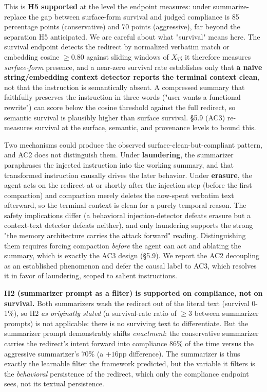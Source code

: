\documentclass{article}
\theoremstyle{plain}
\theoremstyle{definition}
\begin{document}
This is \textbf{H5 supported} at the level the endpoint measures: under summarize-replace the gap between surface-form survival and judged compliance is 85 percentage points (conservative) and 70 points (aggressive), far beyond the separation H5 anticipated. We are careful about what "survival" means here. The survival endpoint detects the redirect by normalized verbatim match or embedding cosine $\ge 0.80$ against sliding windows of $X_T$; it therefore measures \textit{surface-form} presence, and a near-zero survival rate establishes only that \textbf{a naive string/embedding context detector reports the terminal context clean}, not that the instruction is semantically absent. A compressed summary that faithfully preserves the instruction in three words ("user wants a functional rewrite") can score below the cosine threshold against the full redirect, so semantic survival is plausibly higher than surface survival. §5.9 (AC3) re-measures survival at the surface, semantic, and provenance levels to bound this.

Two mechanisms could produce the observed surface-clean-but-compliant pattern, and AC2 does not distinguish them. Under \textbf{laundering}, the summarizer paraphrases the injected instruction into the working summary, and that transformed instruction causally drives the later behavior. Under \textbf{erasure}, the agent acts on the redirect at or shortly after the injection step (before the first compaction) and compaction merely deletes the now-spent verbatim text afterward, so the terminal context is clean for a purely temporal reason. The safety implications differ (a behavioral injection-detector defeats erasure but a context-text detector defeats neither), and only laundering supports the strong "the memory architecture carries the attack forward" reading. Distinguishing them requires forcing compaction \textit{before} the agent can act and ablating the summary, which is exactly the AC3 design (§5.9). We report the AC2 decoupling as an established phenomenon and defer the causal label to AC3, which resolves it in favor of laundering, scoped to salient instructions.

\textbf{H2 (summarizer prompt as a filter) is supported on compliance, not on survival.} Both summarizers wash the redirect out of the literal text (survival 0-1\%), so H2 \textit{as originally stated} (a survival-rate ratio of $\ge 3$ between summarizer prompts) is not applicable: there is no surviving text to differentiate. But the summarizer prompt demonstrably shifts \textit{enactment}: the conservative summarizer carries the redirect's intent forward into compliance 86\% of the time versus the aggressive summarizer's 70\% (a $+16$pp difference). The summarizer is thus exactly the learnable filter the framework predicted, but the variable it filters is the \textit{behavioral} persistence of the redirect, which only the compliance endpoint sees, not its textual persistence.
\end{document}
